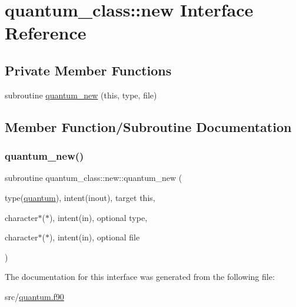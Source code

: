 \hypertarget{interfacequantum__class_1_1new}{}\section{quantum\+\_\+class\+:\+:new Interface Reference}
\label{interfacequantum__class_1_1new}
\subsection*{Private Member Functions}
\begin{DoxyCompactItemize}
\item 
subroutine \hyperlink{interfacequantum__class_1_1new_a32f3d5bc6f9f779cfca18fbee3b033aa}{quantum\+\_\+new} (this, type, file)
\end{DoxyCompactItemize}


\subsection{Member Function/\+Subroutine Documentation}
\mbox{\label{interfacequantum__class_1_1new_a32f3d5bc6f9f779cfca18fbee3b033aa}} 
\subsubsection{\texorpdfstring{quantum\+\_\+new()}{quantum\_new()}}
{\footnotesize\ttfamily subroutine quantum\+\_\+class\+::new\+::quantum\+\_\+new (\begin{DoxyParamCaption}\item[{type(\hyperlink{structquantum__class_1_1quantum}{quantum}), intent(inout), target}]{this,  }\item[{character$\ast$($\ast$), intent(in), optional}]{type,  }\item[{character$\ast$($\ast$), intent(in), optional}]{file }\end{DoxyParamCaption})\hspace{0.3cm}{\ttfamily [private]}}



The documentation for this interface was generated from the following file\+:\begin{DoxyCompactItemize}
\item 
src/\hyperlink{quantum_8f90}{quantum.\+f90}\end{DoxyCompactItemize}
